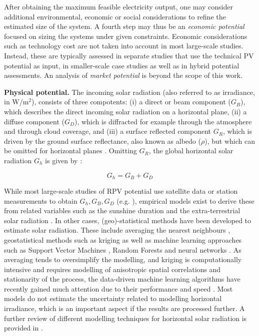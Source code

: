 After obtaining the maximum feasible electricity output, one may consider additional environmental, economic or social considerations to refine the estimated size of the system. A fourth step may thus be an \textit{economic potential} focused on sizing the systems under given constraints. Economic considerations such as technology cost are not taken into account in most large-scale studies. Instead, these are typically assessed in separate studies that use the technical PV potential as input, in smaller-scale case studies as well as in hybrid potential assessments. An analysis of \textit{market potential} is beyond the scope of this work. 

\textbf{Physical potential.} The incoming solar radiation (also referred to as irradiance, in W/m$^2$), consists of three compotents: (i) a direct or beam component ($G_B$), which describes the direct incoming solar radiation on a horizontal plane, (ii) a diffuse component ($G_D$), which is diffracted for example through the atmosphere and through cloud coverage, and (iii) a surface reflected component $G_R$, which is driven by the ground surface reflectance, also known as albedo ($\rho$), but which can be omitted for horizontal planes \cite{assouline_estimation_2017}. Omitting $G_R$, the global horizontal solar radiation $G_h$ is given by \cite{assouline_estimation_2017}:

\begin{equation}
\label{eq:Gh_method}
G_{h} = G_{B} + G_{D}
\end{equation}

While most large-scale studies of RPV potential use satellite data or station measurements to obtain $G_h, G_B, G_D$ (e.g. \cite{bodis_high-resolution_2019,buffat_scalable_2018,ramirez_camargo_spatio-temporal_2015,calcabrini_simplified_2019}), empirical models exist to derive these from related variables such as the sunshine duration and the extra-terrestrial solar radiation \cite{assouline_estimation_2017}. 
In other cases, (geo)-statistical methods have been developed to estimate solar radiation. 
These include averaging the nearest neighbours \cite{klauser_solarpotentialanalyse_2016}, geostatistical methods such as kriging \cite{alsamamra_comparative_2009,rehman_spatial_2000} as well as machine learning approaches such as Support Vector Machines \cite{assouline_quantifying_2017}, Random Forests \cite{assouline_large-scale_2018} and neural networks \cite{hocaoglu_hourly_2008,notton_neural_2013,sahin_application_2013}. As averaging tends to oversimplify the modelling, and kriging is computationally intensive and requires modelling of anisotropic spatial correlations and stationarity of the process, the data-driven machine learning algorithms have recently gained much attention due to their performance and speed \cite{kanevski_machine_2009}. 
Most models do not estimate the uncertainty related to modelling horizontal irradiance, which is an important aspect if the results are processed further.
A further review of different modelling techniques for horizontal solar radiation is provided in \cite{zhang_review_2018}.

